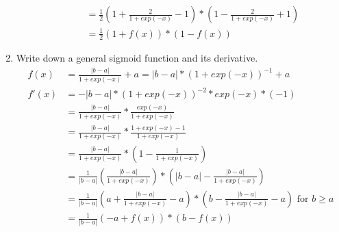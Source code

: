 \documentclass{article}
\begin{document}
\begin{enumerate}
\begin{enumerate}
\begin{align*}
              &= \frac{1}{2}(1+\frac{2}{1+exp(-x)} -1)*(1-\frac{2}{1+exp(-x)}+1)\\
              &= \frac{1}{2}(1+f(x))*(1-f(x))
    \end{align*}
        \end{enumerate}
    \item Write down a general sigmoid function and its derivative.
        \begin{align*}
            f(x) &= \frac{|b-a|}{1+exp(-x)}+a  =
            |b-a|*(1+exp(-x))^{-1}+a\\
            f'(x) &= -|b-a|*(1+exp(- x))^{-2}*exp(-x)*(-1)\\
                  &= \frac{|b-a|}{1+exp(- x)}*\frac{exp(-x)}{1+exp(- x)}\\
                  &= \frac{|b-a|}{1+exp(- x)}*\frac{1+exp(-x)-1}{1+exp(- x)}\\
                  &= \frac{|b-a|}{1+exp(-x)}*(1-\frac{1}{1+exp(- x)})\\
                  &= \frac{1}{|b-a|}(\frac{|b-a|}{1+exp(-x)})*(|b-a|-\frac{|b-a|}{1+exp(-x)})\\
                  &= \frac{1}{|b-a|}(a+\frac{|b-a|}{1+exp(-x)}
            -a)*(b-\frac{|b-a|}{1+exp(-x)}-a) \text{ for } b \geq a\\
            &= \frac{1}{|b-a|}(-a+f(x))*(b-f(x))\\
        \end{align*}
\end{enumerate}
\end{document}
